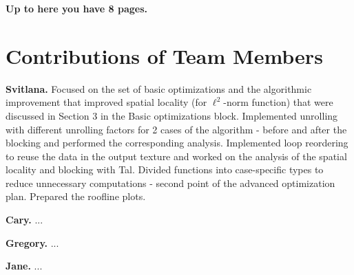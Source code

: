 \documentclass[letterpaper]{article}
\newcommand{\mypar}[1]{{\bf #1.}}
\begin{document}
\bigskip
{\bf Up to here you have 8 pages.}

\section{Contributions of Team Members}

\mypar{Svitlana} Focused on the set of basic optimizations and the algorithmic improvement that improved spatial locality (for $\ell ^2$-norm function) that were discussed in Section 3 in the Basic optimizations block. Implemented unrolling with different unrolling factors for 2 cases of the algorithm - before and after the blocking and performed the corresponding analysis. Implemented loop reordering to reuse the data in the output texture and worked on the analysis of the spatial locality and blocking with Tal. Divided functions into case-specific types to reduce unnecessary computations - second point of the advanced optimization plan. Prepared the roofline plots.

\mypar{Cary} ...

\mypar{Gregory} ...

\mypar{Jane} ...





\end{document}
